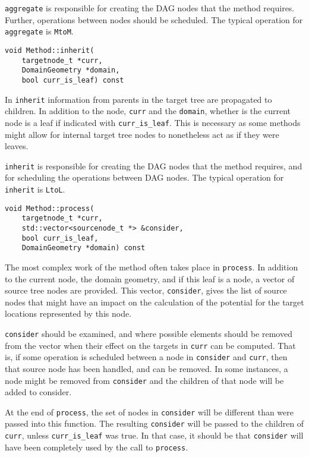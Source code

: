 \texttt{aggregate} is responsible for creating the DAG nodes that the method
requires. Further, operations between nodes should be scheduled. The typical
operation for \texttt{aggregate} is \texttt{MtoM}.

\begin{lstlisting}
void Method::inherit(
    targetnode_t *curr,
    DomainGeometry *domain,
    bool curr_is_leaf) const
\end{lstlisting}

\noindent
In \texttt{inherit} information from parents in the target tree are propagated
to children. In addition to the node, \texttt{curr} and the \texttt{domain},
whether is the current node is a leaf if indicated with
\texttt{curr\_is\_leaf}. This is necessary as some methods might allow for
internal target tree nodes to nonetheless act as if they were leaves.

\texttt{inherit} is responsible for creating the DAG nodes that the method
requires, and for scheduling the operations between DAG nodes. The typical
operation for \texttt{inherit} is \texttt{LtoL}.


\begin{lstlisting}
void Method::process(
    targetnode_t *curr,
    std::vector<sourcenode_t *> &consider,
    bool curr_is_leaf,
    DomainGeometry *domain) const
\end{lstlisting}

\noindent
The most complex work of the method often takes place in \texttt{process}. In
addition to the current node, the domain geometry, and if this leaf is a node,
a vector of source tree nodes are provided. This vector, \texttt{consider},
gives the list of source nodes that might have an impact on the calculation of
the potential for the target locations represented by this node.

\texttt{consider} should be examined, and where possible elements should be
removed from the vector when their effect on the targets in \texttt{curr} can
be computed. That is, if some operation is scheduled between a node in
\texttt{consider} and \texttt{curr}, then that source node has been handled,
and can be removed. In some instances, a node might be removed from
\texttt{consider} and the children of that node will be added to consider.

At the end of \texttt{process}, the set of nodes in \texttt{consider} will be
different than were passed into this function. The resulting \texttt{consider}
will be passed to the children of \texttt{curr}, unless \texttt{curr\_is\_leaf}
was true. In that case, it should be that \texttt{consider} will have been
completely used by the call to \texttt{process}.

